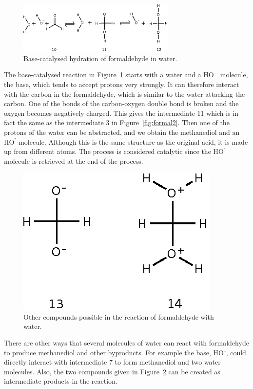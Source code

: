 \begin{figure}[h!]
  \centering
    \includegraphics[width=0.7\textwidth]{formaldehyde_base}
  \caption{Base-catalysed hydration of formaldehyde in water.}
  \label{fig:basecat}
\end{figure}

The base-catalysed reaction in Figure~\ref{fig:basecat} starts with a water and a $\mathrm{HO^-}$ molecule, 
the base, which tends to accept protons very strongly. It can therefore interact with the carbon 
in the formaldehyde, which is similar to the water attacking the carbon. 
One of the bonds of the carbon-oxygen double bond is broken and the oxygen becomes negatively charged. 
This gives the intermediate 11 which is in fact the same as the intermediate 3 in 
Figure~\ref{fig:formal2}.
Then one of the protons of the water can be abstracted, and we obtain the methanediol and an 
$\mathrm{HO^⁻}$ molecule. Although this is the same structure as the original acid, it is made up 
from different atoms.  The process is considered catalytic since the $\mathrm{HO^⁻}$  molecule 
is retrieved at the end of the process.
\begin{figure}[h!]
\centering
      \includegraphics[width=.35\textwidth]{formaldehyde72}
        \caption{Other compounds possible in the reaction of formaldehyde with water.}
  \label{fig:misc}
\end{figure}

There are other ways that several molecules of water can react with formaldehyde to produce methanediol
and other byproducts. For example the base, $\mathrm{HO⁻}$, could directly interact with intermediate 7 
to form methanediol and two water molecules. 
Also, the two compounds given in Figure~\ref{fig:misc} can be created as intermediate products 
in the reaction. 

